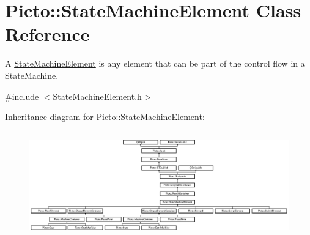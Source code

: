 \hypertarget{class_picto_1_1_state_machine_element}{\section{Picto\-:\-:State\-Machine\-Element Class Reference}
\label{class_picto_1_1_state_machine_element}
}


A \hyperlink{class_picto_1_1_state_machine_element}{State\-Machine\-Element} is any element that can be part of the control flow in a \hyperlink{class_picto_1_1_state_machine}{State\-Machine}.  




{\ttfamily \#include $<$State\-Machine\-Element.\-h$>$}

Inheritance diagram for Picto\-:\-:State\-Machine\-Element\-:\begin{figure}[H]
\begin{center}
\leavevmode
\includegraphics[height=4.631579cm]{class_picto_1_1_state_machine_element}
\end{center}
\end{figure}
